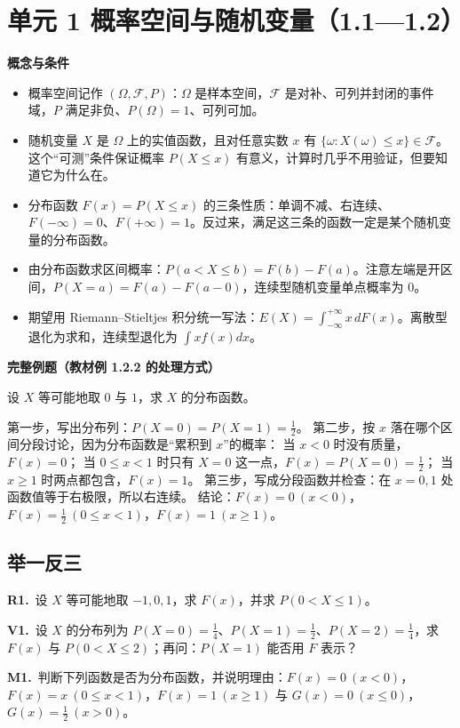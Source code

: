 \documentclass[UTF8,a4paper,11pt]{ctexart}
\newcommand{\CompactQuestion}[2]{\par\noindent\textbf{#1.}\ #2\par\vspace{.8em}}
\begin{document}
\clearpage
{}
\section{单元 1 概率空间与随机变量（1.1—1.2）}
\textbf{概念与条件}

\begin{itemize}
\item 概率空间记作 $(\Omega,\mathcal{F},P)$：$\Omega$ 是样本空间，$\mathcal{F}$ 是对补、可列并封闭的事件域，$P$ 满足非负、$P(\Omega)=1$、可列可加。
\item 随机变量 $X$ 是 $\Omega$ 上的实值函数，且对任意实数 $x$ 有 $\{\omega:X(\omega)\le x\}\in\mathcal{F}$。这个“可测”条件保证概率 $P(X\le x)$ 有意义，计算时几乎不用验证，但要知道它为什么在。
\item 分布函数 $F(x)=P(X\le x)$ 的三条性质：单调不减、右连续、$F(-\infty)=0$、$F(+\infty)=1$。反过来，满足这三条的函数一定是某个随机变量的分布函数。
\item 由分布函数求区间概率：$P(a<X\le b)=F(b)-F(a)$。注意左端是开区间，$P(X=a)=F(a)-F(a-0)$，连续型随机变量单点概率为 0。
\item 期望用 Riemann–Stieltjes 积分统一写法：$E(X)=\int_{-\infty}^{+\infty}x\,dF(x)$。离散型退化为求和，连续型退化为 $\int x f(x)dx$。
\end{itemize}
\textbf{完整例题（教材例 1.2.2 的处理方式）}

设 $X$ 等可能地取 $0$ 与 $1$，求 $X$ 的分布函数。

第一步，写出分布列：$P(X=0)=P(X=1)=\frac12$。 第二步，按 $x$ 落在哪个区间分段讨论，因为分布函数是“累积到 $x$”的概率： 当 $x<0$ 时没有质量，$F(x)=0$； 当 $0\le x<1$ 时只有 $X=0$ 这一点，$F(x)=P(X=0)=\frac12$； 当 $x\ge 1$ 时两点都包含，$F(x)=1$。 第三步，写成分段函数并检查：在 $x=0,1$ 处函数值等于右极限，所以右连续。 结论：$F(x)=0\ (x<0)$，$F(x)=\frac12\ (0\le x<1)$，$F(x)=1\ (x\ge 1)$。

\subsection{举一反三}
\CompactQuestion{R1}{设 $X$ 等可能地取 $-1,0,1$，求 $F(x)$，并求 $P(0<X\le 1)$。}
\CompactQuestion{V1}{设 $X$ 的分布列为 $P(X=0)=\frac14$、$P(X=1)=\frac12$、$P(X=2)=\frac14$，求 $F(x)$ 与 $P(0<X\le 2)$；再问：$P(X=1)$ 能否用 $F$ 表示？}
\CompactQuestion{M1}{判断下列函数是否为分布函数，并说明理由：$F(x)=0\ (x<0)$，$F(x)=x\ (0\le x<1)$，$F(x)=1\ (x\ge 1)$ 与 $G(x)=0\ (x\le 0)$，$G(x)=\frac12\ (x>0)$。}
\clearpage
{}
\end{document}
